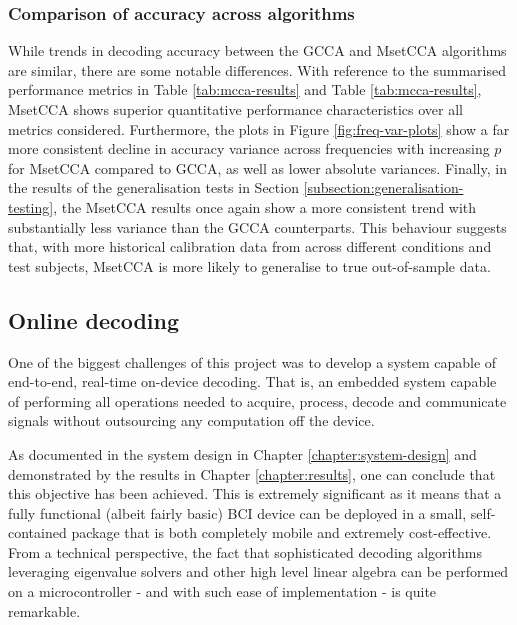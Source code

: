 \subsubsection{Comparison of accuracy across algorithms}
\label{subsection:algo-comparison-results}
While trends in decoding accuracy between the GCCA and MsetCCA algorithms are similar, there are some notable differences. With reference to the summarised performance metrics in Table \ref{tab:mcca-results} and Table \ref{tab:mcca-results}, MsetCCA shows superior quantitative performance characteristics over all metrics considered. Furthermore, the plots in Figure \ref{fig:freq-var-plots} show a far more consistent decline in accuracy variance across frequencies with increasing $p$ for MsetCCA compared to GCCA, as well as lower absolute variances. Finally, in the results of the generalisation tests in Section \ref{subsection:generalisation-testing}, the MsetCCA results once again show a more consistent trend with substantially less variance than the GCCA counterparts. This behaviour suggests that, with more historical calibration data from across different conditions and test subjects, MsetCCA is more likely to generalise to true out-of-sample data.

\subsection{Online decoding}
One of the biggest challenges of this project was to develop a system capable of end-to-end, real-time on-device decoding. That is, an embedded system capable of performing all operations needed to acquire, process, decode and communicate signals without outsourcing any computation off the device. 

As documented in the system design in Chapter \ref{chapter:system-design} and demonstrated by the results in Chapter \ref{chapter:results}, one can conclude that this objective has been achieved. This is extremely significant as it means that a fully functional (albeit fairly basic) BCI device can be deployed in a small, self-contained package that is both completely mobile and extremely cost-effective. From a technical perspective, the fact that sophisticated decoding algorithms leveraging eigenvalue solvers and other high level linear algebra can be performed on a microcontroller - and with such ease of implementation - is quite remarkable.  

